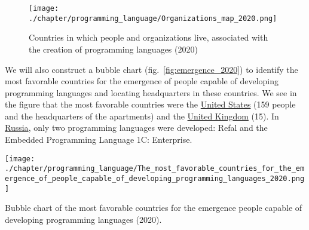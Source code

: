 \begin{figure}[h]
\centering
	\texttt{[image: ./chapter/programming\_language/Organizations\_map\_2020.png]}
	\caption{Countries in which people and organizations live, associated with the creation of programming languages (2020)}
	\label{fig:organizations_2020}
\end{figure}

We will also construct a bubble chart (fig.~\ref{fig:emergence_2020}) to identify the most favorable countries for the emergence of people capable of developing programming languages and locating headquarters in these countries. We see in the figure that the most favorable countries were the \href{https://en.wikipedia.org/wiki/United_States}{United States} (159 people and the headquarters of the apartments) and the \href{https://en.wikipedia.org/wiki/United_Kingdom}{United Kingdom} (15). In \href{https://en.wikipedia.org/wiki/Russia}{Russia}, only two programming languages were developed: Refal and the Embedded Programming Language 1C: Enterprise.

\begin{marginfigure}[7cm]
	\texttt{[image: ./chapter/programming\_language/The\_most\_favorable\_countries\_for\_the\_emergence\_of\_people\_capable\_of\_developing\_programming\_languages\_2020.png]}
	\caption{Bubble chart of the most favorable countries for the emergence people capable of developing programming languages (2020).}
	\label{fig:emergence_2020}
\end{marginfigure}

